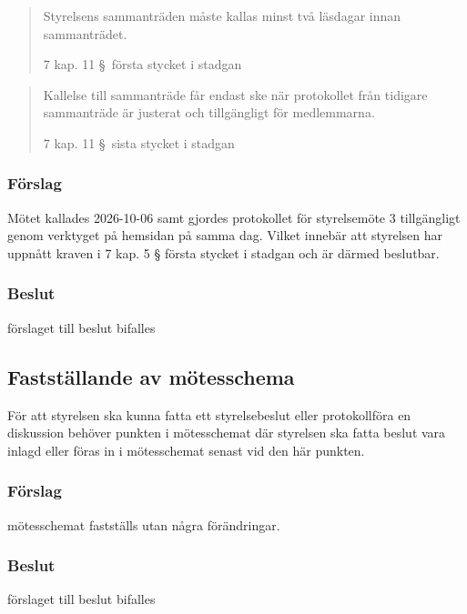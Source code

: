 \documentclass[protokoll]{dvd}
\begin{document}
\blockquote[7 kap. 11 \S~första stycket i stadgan]{
Styrelsens sammanträden måste kallas minst två läsdagar innan sammanträdet. }

\blockquote[7 kap. 11 \S~sista stycket i stadgan]{
Kallelse till sammanträde får endast ske när protokollet från tidigare sammanträde är justerat och tillgängligt för medlemmarna.}

\subsubsection*{Förslag}

\begin{attsatser}
    \item Mötet kallades 2026-10-06 samt gjordes protokollet för styrelsemöte 3 tillgängligt genom verktyget på hemsidan på samma dag.
    Vilket innebär att styrelsen har uppnått kraven i 7 kap. 5 § första stycket i stadgan och är därmed beslutbar.
\end{attsatser}
\subsubsection*{Beslut}
\begin{attsatser}
    \item förslaget till beslut bifalles
\end{attsatser}


\subsection{Fastställande av mötesschema}

För att styrelsen ska kunna fatta ett styrelsebeslut eller protokollföra en diskussion behöver punkten i mötesschemat där styrelsen ska fatta beslut vara inlagd eller föras in i mötesschemat senast vid den här punkten.

\subsubsection*{Förslag}

\begin{attsatser}
    \item 
    mötesschemat fastställs utan några förändringar.
\end{attsatser}
\subsubsection*{Beslut}
\begin{attsatser}
    \item förslaget till beslut bifalles
\end{attsatser}
\end{document}
